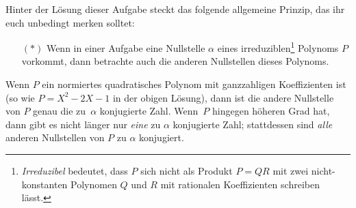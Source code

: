 Hinter der Lösung dieser Aufgabe steckt das folgende allgemeine Prinzip, das ihr euch unbedingt merken solltet:
\begin{enumerate}\itshape
	\item[$(*)$] Wenn in einer Aufgabe eine Nullstelle $\alpha$ eines irreduziblen\footnote{\emph{Irreduzibel} bedeutet, dass $P$ sich nicht als Produkt $P=QR$ mit zwei nicht-konstanten Polynomen $Q$ und $R$ mit rationalen Koeffizienten schreiben lässt.} Polynoms $P$ vorkommt, dann betrachte auch die anderen Nullstellen dieses Polynoms.
\end{enumerate}
Wenn $P$ ein normiertes quadratisches Polynom mit ganzzahligen Koeffizienten ist (so wie $P=X^2-2X-1$ in der obigen Lösung), dann ist die andere Nullstelle von $P$ genau die zu~$\alpha$ konjugierte Zahl. Wenn~$P$ hingegen höheren Grad hat, dann gibt es nicht länger nur \emph{eine} zu $\alpha$ konjugierte Zahl; stattdessen sind \emph{alle} anderen Nullstellen von $P$ zu $\alpha$ konjugiert.

